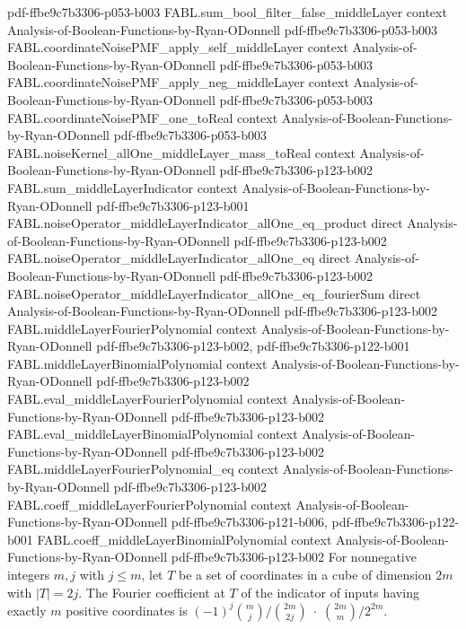 \begin{theorem}
  {pdf-ffbe9c7b3306-p053-b003}
\proofstep
  {FABL.sum_bool_filter_false_middleLayer}
  {context}
  {Analysis-of-Boolean-Functions-by-Ryan-ODonnell}
  {pdf-ffbe9c7b3306-p053-b003}
\proofstep
  {FABL.coordinateNoisePMF_apply_self_middleLayer}
  {context}
  {Analysis-of-Boolean-Functions-by-Ryan-ODonnell}
  {pdf-ffbe9c7b3306-p053-b003}
\proofstep
  {FABL.coordinateNoisePMF_apply_neg_middleLayer}
  {context}
  {Analysis-of-Boolean-Functions-by-Ryan-ODonnell}
  {pdf-ffbe9c7b3306-p053-b003}
\proofstep
  {FABL.coordinateNoisePMF_one_toReal}
  {context}
  {Analysis-of-Boolean-Functions-by-Ryan-ODonnell}
  {pdf-ffbe9c7b3306-p053-b003}
\proofstep
  {FABL.noiseKernel_allOne_middleLayer_mass_toReal}
  {context}
  {Analysis-of-Boolean-Functions-by-Ryan-ODonnell}
  {pdf-ffbe9c7b3306-p123-b002}
\proofstep
  {FABL.sum_middleLayerIndicator}
  {context}
  {Analysis-of-Boolean-Functions-by-Ryan-ODonnell}
  {pdf-ffbe9c7b3306-p123-b001}
\proofstep
  {FABL.noiseOperator_middleLayerIndicator_allOne_eq_product}
  {direct}
  {Analysis-of-Boolean-Functions-by-Ryan-ODonnell}
  {pdf-ffbe9c7b3306-p123-b002}
\proofstep
  {FABL.noiseOperator_middleLayerIndicator_allOne_eq}
  {direct}
  {Analysis-of-Boolean-Functions-by-Ryan-ODonnell}
  {pdf-ffbe9c7b3306-p123-b002}
\proofstep
  {FABL.noiseOperator_middleLayerIndicator_allOne_eq_fourierSum}
  {direct}
  {Analysis-of-Boolean-Functions-by-Ryan-ODonnell}
  {pdf-ffbe9c7b3306-p123-b002}
\proofstep
  {FABL.middleLayerFourierPolynomial}
  {context}
  {Analysis-of-Boolean-Functions-by-Ryan-ODonnell}
  {pdf-ffbe9c7b3306-p123-b002,
    pdf-ffbe9c7b3306-p122-b001}
\proofstep
  {FABL.middleLayerBinomialPolynomial}
  {context}
  {Analysis-of-Boolean-Functions-by-Ryan-ODonnell}
  {pdf-ffbe9c7b3306-p123-b002}
\proofstep
  {FABL.eval_middleLayerFourierPolynomial}
  {context}
  {Analysis-of-Boolean-Functions-by-Ryan-ODonnell}
  {pdf-ffbe9c7b3306-p123-b002}
\proofstep
  {FABL.eval_middleLayerBinomialPolynomial}
  {context}
  {Analysis-of-Boolean-Functions-by-Ryan-ODonnell}
  {pdf-ffbe9c7b3306-p123-b002}
\proofstep
  {FABL.middleLayerFourierPolynomial_eq}
  {context}
  {Analysis-of-Boolean-Functions-by-Ryan-ODonnell}
  {pdf-ffbe9c7b3306-p123-b002}
\proofstep
  {FABL.coeff_middleLayerFourierPolynomial}
  {context}
  {Analysis-of-Boolean-Functions-by-Ryan-ODonnell}
  {pdf-ffbe9c7b3306-p121-b006,
    pdf-ffbe9c7b3306-p122-b001}
\proofstep
  {FABL.coeff_middleLayerBinomialPolynomial}
  {context}
  {Analysis-of-Boolean-Functions-by-Ryan-ODonnell}
  {pdf-ffbe9c7b3306-p123-b002}
For nonnegative integers $m,j$ with $j\le m$, let $T$ be a set of coordinates in a cube
of dimension $2m$ with $|T|=2j$. The Fourier coefficient at $T$ of the indicator of
inputs having exactly $m$ positive coordinates is
$(-1)^j\binom{m}{j}\big/\binom{2m}{2j}\;\cdot\;\binom{2m}{m}/2^{2m}$.
\end{theorem}


